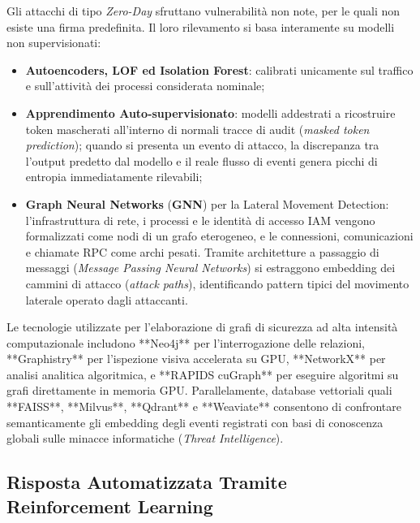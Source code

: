 \documentclass[11pt, a4paper]{article}
\begin{document}
Gli attacchi di tipo \emph{Zero-Day} sfruttano vulnerabilità non note, per le quali non esiste una firma predefinita. Il loro rilevamento si basa interamente su modelli non supervisionati:
\begin{itemize}
    \item \textbf{Autoencoders, LOF ed Isolation Forest}: calibrati unicamente sul traffico e sull'attività dei processi considerata nominale;
    \item \textbf{Apprendimento Auto-supervisionato}: modelli addestrati a ricostruire token mascherati all'interno di normali tracce di audit (\emph{masked token prediction}); quando si presenta un evento di attacco, la discrepanza tra l'output predetto dal modello e il reale flusso di eventi genera picchi di entropia immediatamente rilevabili;
    \item \textbf{Graph Neural Networks} (\textbf{GNN}) per la Lateral Movement Detection: l'infrastruttura di rete, i processi e le identità di accesso IAM vengono formalizzati come nodi di un grafo eterogeneo, e le connessioni, comunicazioni e chiamate RPC come archi pesati. Tramite architetture a passaggio di messaggi (\emph{Message Passing Neural Networks}) si estraggono embedding dei cammini di attacco (\emph{attack paths}), identificando pattern tipici del movimento laterale operato dagli attaccanti.
\end{itemize}

Le tecnologie utilizzate per l'elaborazione di grafi di sicurezza ad alta intensità computazionale includono **Neo4j** per l'interrogazione delle relazioni, **Graphistry** per l'ispezione visiva accelerata su GPU, **NetworkX** per analisi analitica algoritmica, e **RAPIDS cuGraph** per eseguire algoritmi su grafi direttamente in memoria GPU. Parallelamente, database vettoriali quali **FAISS**, **Milvus**, **Qdrant** e **Weaviate** consentono di confrontare semanticamente gli embedding degli eventi registrati con basi di conoscenza globali sulle minacce informatiche (\emph{Threat Intelligence}).


\subsection{Risposta Automatizzata Tramite Reinforcement Learning}
\end{document}

